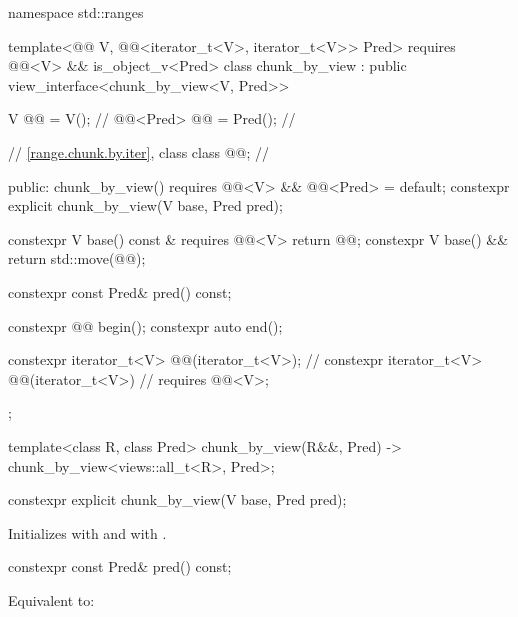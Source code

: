 \begin{codeblock}
namespace std::ranges {
  template<@@ V, @@<iterator_t<V>, iterator_t<V>> Pred>
    requires @@<V> && is_object_v<Pred>
  class chunk_by_view : public view_interface<chunk_by_view<V, Pred>> {
    V @@ = V();                                          // \expos
    @@<Pred> @@ = Pred();                       // \expos

    // \ref{range.chunk.by.iter}, class 
    class @@;                                         // \expos

  public:
    chunk_by_view() requires @@<V> && @@<Pred> = default;
    constexpr explicit chunk_by_view(V base, Pred pred);

    constexpr V base() const & requires @@<V> { return @@; }
    constexpr V base() && { return std::move(@@); }

    constexpr const Pred& pred() const;

    constexpr @@ begin();
    constexpr auto end();

    constexpr iterator_t<V> @@(iterator_t<V>);       // \expos
    constexpr iterator_t<V> @@(iterator_t<V>)        // \expos
      requires @@<V>;
  };

  template<class R, class Pred>
    chunk_by_view(R&&, Pred) -> chunk_by_view<views::all_t<R>, Pred>;
}
\end{codeblock}

\begin{itemdecl}
constexpr explicit chunk_by_view(V base, Pred pred);
\end{itemdecl}

\begin{itemdescr}
\pnum
\effects
Initializes  with  and
 with .
\end{itemdescr}

%
\begin{itemdecl}
constexpr const Pred& pred() const;
\end{itemdecl}

\begin{itemdescr}
\pnum
\effects
Equivalent to: 
\end{itemdescr}

